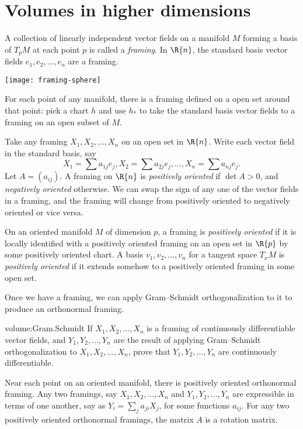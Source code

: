\chapter{Volumes in higher dimensions}


A collection of linearly independent vector fields on a manifold \(M\) forming a basis of \(T_p M\) at each point \(p\) is called a \emph{framing}.%
In \(\R{n}\), the standard basis vector fields \(e_1, e_2, \dots, e_n\) are a framing.
\begin{marginfigure}
\centering
\setlength\fboxsep{0pt}
\setlength\fboxrule{0.5pt}
\texttt{[image: framing-sphere]}%
\end{marginfigure}

For each point of any manifold, there is a framing defined on a open set around that point: pick a chart \(h\) and use \(h_*\) to take the standard basis vector fields to a framing on an open subset of \(M\).

Take any framing \(X_1, X_2, \dots, X_n\) on an open set in \(\R{n}\).
Write each vector field in the standard basis, say
\[
X_1 = \sum a_{1j} e_j, X_2 = \sum a_{2j} e_j, \dots, X_n = \sum a_{nj} e_j.
\]
Let \(A=\left(a_{ij}\right)\).
A framing on \(\R{n}\) is \emph{positively oriented} if \(\det A > 0\), and \emph{negatively oriented} otherwise.
We can swap the sign of any one of the vector fields in a framing, and the framing will change from positively oriented to negatively oriented or vice versa.

On an oriented manifold \(M\) of dimension \(p\), a framing is \emph{positively oriented}%
if it is locally identified with a positively oriented framing on an open set in \(\R{p}\) by some positively oriented chart.
A basis \(v_1, v_2, \dots, v_n\) for a tangent space \(T_x M\) is \emph{positively oriented}%
if it extends somehow to a positively oriented framing in some open set.

Once we have a framing, we can apply Gram--Schmidt orthogonalization to it to produce an orthonormal framing.
\begin{problem}{volume:Gram.Schmidt}
If \(X_1, X_2, \dots, X_n\) is a framing of continuously differentiable vector fields, and \(Y_1, Y_2, \dots, Y_n\) are the result of applying Gram--Schmidt orthogonalization to \(X_1, X_2, \dots, X_n\), prove that \(Y_1, Y_2, \dots, Y_n\) are continuously differentiable.
\end{problem}
Near each point on an oriented manifold, there is positively oriented orthonormal framing.
Any two framings, say \(X_1, X_2, \dots, X_n\) and \(Y_1, Y_2, \dots, Y_n\) are expressible in terms of one another, say as \(Y_i = \sum_j a_{ji} X_j\), for some functions \(a_{ij}\). 
For any two positively oriented orthonormal framings, the matrix \(A\) is a rotation matrix.

